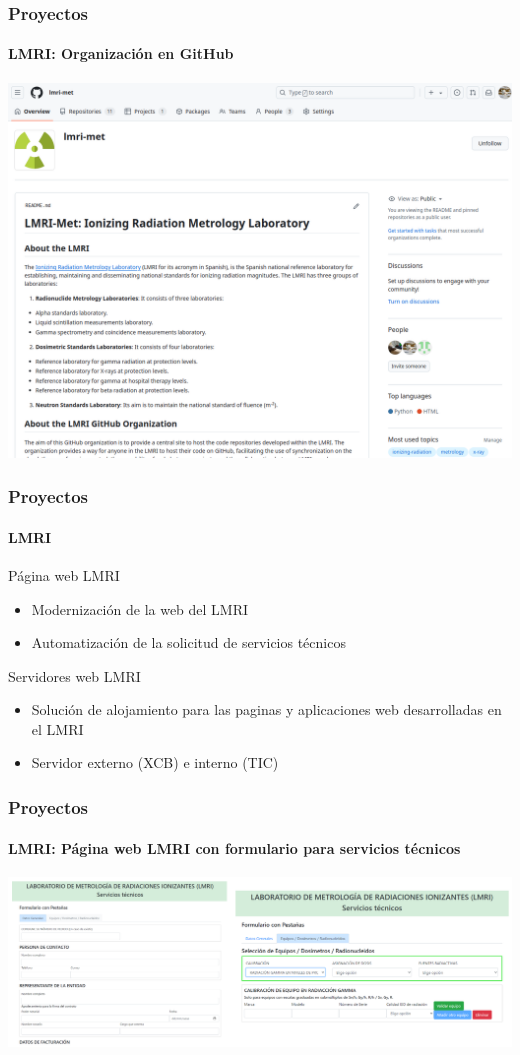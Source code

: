 \documentclass{beamer}
\newcommand{\highlight}[1]{{\color{blue} #1}}
\begin{document}
	\begin{frame}
		\frametitle{Proyectos}
		\framesubtitle{LMRI: Organización en GitHub}
		\centering
		\includegraphics[width=\textwidth]{LMRI_github_org}
	\end{frame}
	
	\begin{frame}
		\frametitle{Proyectos}
		\framesubtitle{LMRI}
		Página web LMRI
		\begin{itemize}
			\item \highlight{Modernización} de la web del LMRI
			\item Automatización de la solicitud de \highlight{servicios técnicos}
		\end{itemize}
		Servidores web LMRI
		\begin{itemize}
			\item Solución de \highlight{alojamiento} para las paginas y aplicaciones web desarrolladas en el LMRI
			\item \highlight{Servidor} externo (XCB) e interno (TIC) 
		\end{itemize}
	\end{frame}
	
	\begin{frame}
		\frametitle{Proyectos}
		\framesubtitle{LMRI: Página web LMRI con formulario para servicios técnicos}
		\centering
		\includegraphics[width=\textwidth]{LMRI_servicios_tecnicos}
	\end{frame}
	
\end{document}
